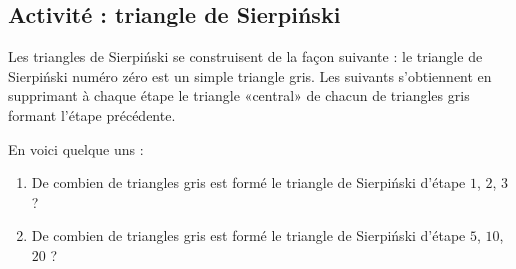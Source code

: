 
\subsection*{Activité : triangle de Sierpiński}

Les triangles de Sierpiński se construisent de la façon suivante : le triangle de Sierpiński numéro zéro est un simple triangle gris. Les suivants s'obtiennent en supprimant à chaque étape le triangle «central» de chacun de triangles gris formant l'étape précédente.

En voici quelque uns :

\newcommand{\CaptionFigMOCGooKjSrVV}{Quelque triangles de Sierpiński}


\begin{enumerate}
    \item
        De combien de triangles gris est formé le triangle de Sierpiński d'étape \( 1\), \( 2\), \( 3\) ?
    \item
        De combien de triangles gris est formé le triangle de Sierpiński d'étape \( 5\), \( 10\), \( 20\) ?
\end{enumerate}

